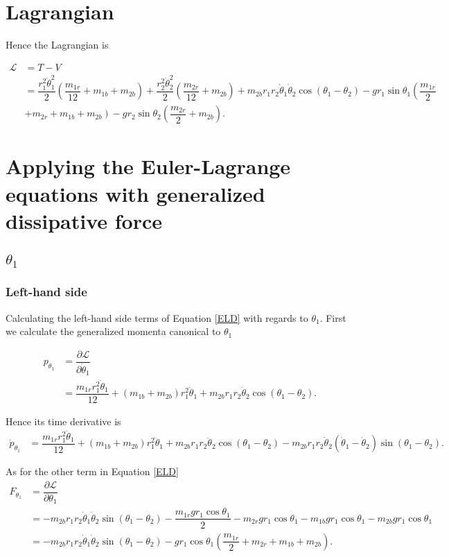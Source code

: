 \documentclass[12pt,a4paper,portrait]{article}
\begin{document}
	\section{Lagrangian}
	Hence the Lagrangian is
	
	\begin{align*}
		\mathcal{L} &= T - V \\
		&= \dfrac{r_1^2 \dot{\theta}_1^2}{2} \left(\dfrac{m_{1r}}{12} + m_{1b} + m_{2b}\right) + \dfrac{r_2^2 \dot{\theta}_2^2}{2} \left(\dfrac{m_{2r}}{12} + m_{2b}\right) + m_{2b}r_1 r_2 \dot{\theta}_1 \dot{\theta}_2 \cos{(\theta_1-\theta_2)} - gr_1 \sin{\theta_1}\left(\dfrac{m_{1r}}{2} \right.\\
		&\left.+ m_{2r} + m_{1b} + m_{2b}\right) - gr_2 \sin{\theta_2}\left(\dfrac{m_{2r}}{2} + m_{2b}\right).
	\end{align*}
	
	\section{Applying the Euler-Lagrange equations with generalized dissipative force}
	\subsection{$\theta_1$}
	\subsubsection{Left-hand side}
	Calculating the left-hand side terms of Equation \eqref{ELD} with regards to $\theta_1$. First we calculate the generalized momenta canonical to $\theta_1$
	
	\begin{align*}
		p_{\theta_1} &= \dfrac{\partial \mathcal{L}}{\partial \dot{\theta}_1} \\
		&= \dfrac{m_{1r}r_1^2 \dot{\theta}_1}{12} + (m_{1b}+m_{2b}) r_1^2 \dot{\theta}_1 + m_{2b}r_1 r_2 \dot{\theta}_2 \cos{\left(\theta_1-\theta_2\right)}.
	\end{align*}
	
	Hence its time derivative is
	\begin{align*}
		\dot{p}_{\theta_1} &= \dfrac{m_{1r} r_1^2 \ddot{\theta}_1}{12} + (m_{1b}+m_{2b})r_1^2 \ddot{\theta}_1 + m_{2b}r_1 r_2 \ddot{\theta}_2\cos{(\theta_1-\theta_2)} - m_{2b}r_1 r_2 \dot{\theta}_2\left(\dot{\theta}_1 - \dot{\theta}_2\right)\sin{(\theta_1-\theta_2)}.
	\end{align*}
	
	As for the other term in Equation \eqref{ELD}
	\begin{align*}		
		F_{\theta_1} &= \dfrac{\partial \mathcal{L}}{\partial \theta_1} \\
		&= -m_{2b}r_1r_2\dot{\theta}_1\dot{\theta}_2 \sin{(\theta_1-\theta_2)} - \dfrac{m_{1r}gr_1 \cos{\theta_1}}{2} -m_{2r}gr_1 \cos{\theta_1} -m_{1b}gr_1 \cos{\theta_1} -m_{2b}gr_1 \cos{\theta_1} \\
		&= -m_{2b}r_1r_2\dot{\theta}_1\dot{\theta}_2 \sin{(\theta_1-\theta_2)} -gr_1\cos{\theta_1}\left(\dfrac{m_{1r}}{2}+m_{2r}+m_{1b} + m_{2b}\right).
	\end{align*}
	
\end{document}
